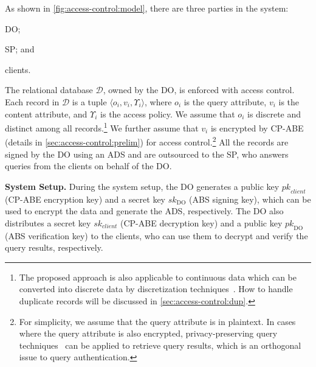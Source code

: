 As shown in \cref{fig:access-control:model}, there are three parties in the system:
\begin{inlineenum}
\item DO\@;
\item SP\@; and
\item clients.
\end{inlineenum}
The relational database $\mathcal{D}$, owned by the DO, is enforced with access control. Each record in $\mathcal{D}$ is a tuple $\langle o_i, v_i, \Upsilon_i\rangle$, where $o_i$ is the query attribute, $v_i$ is the content attribute, and $\Upsilon_i$ is the access policy. We assume that $o_i$ is discrete and distinct among all records.\enlargethispage{\baselineskip}\footnote{The proposed approach is also applicable to continuous data which can be converted into discrete data by discretization techniques~\cite{Kotsiantis2006}. How to handle duplicate records will be discussed in \cref{sec:access-control:dup}.} We further assume that $v_i$ is encrypted by CP-ABE~\cite{10.1109/sp.2007.11} (details in \cref{sec:access-control:prelim}) for access control.\footnote{For simplicity, we assume that the query attribute is in plaintext. In cases where the query attribute is also encrypted,
privacy-preserving query techniques~\cite{10.1145/2699026.2699101} can be applied to retrieve query results, which is an orthogonal issue to query authentication.}
All the records are signed by the DO using an ADS and are outsourced to the SP, who answers queries from the clients on behalf of the DO\@.

\textbf{System Setup.}
During the system setup, the DO generates a public key ${pk}_{client}$ (CP-ABE encryption key) and a secret key ${sk}_\text{DO}$ (ABS signing key), which can be used to encrypt the data and generate the ADS, respectively. The DO also distributes a secret key ${sk}_{client}$ (CP-ABE decryption key) and a public key ${pk}_\text{DO}$ (ABS verification key) to the clients, who can use them to decrypt and verify the query results, respectively.

